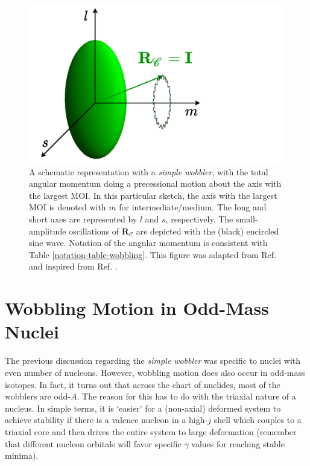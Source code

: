 \begin{figure}
    \centering
    \includegraphics[scale=0.6]{Chapters/Figures/simple_wobbler-schematic.pdf}
    \caption{A schematic representation with a \emph{simple wobbler}, with the total angular momentum doing a precessional motion about the axis with the largest MOI. In this particular sketch, the axis with the largest MOI is denoted with $m$ for intermediate/medium. The long and short axes are represented by $l$ and $s$, respectively. The small-amplitude oscillations of $\mathbf{R}_\mathscr{C}$ are depicted with the (black) encircled sine wave. Notation of the angular momentum is consistent with Table \ref{notation-table-wobbling}. This figure was adapted from Ref. \cite{poenaru2021extensive1} and inspired from Ref. \cite{sensharma2020longitudinal}.}
    \label{simple-wobbler-geometrical-schematic}
\end{figure}

\section{Wobbling Motion in Odd-Mass Nuclei}
\label{chapter-5-odd-wobbling-theory}

The previous discussion regarding the \emph{simple wobbler} was specific to nuclei with even number of nucleons. However, wobbling motion does also occur in odd-mass isotopes. In fact, it turns out that across the chart of nuclides, most of the wobblers are odd-$A$. The reason for this has to do with the triaxial nature of a nucleus. In simple terms, it is `easier' for a (non-axial) deformed system to achieve stability if there is a valence nucleon in a high-$j$ shell which couples to a triaxial core and then drives the entire system to large deformation (remember that different nucleon orbitals will favor specific $\gamma$ values for reaching stable minima).

